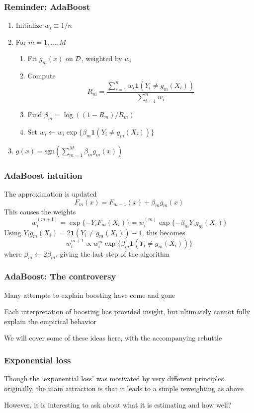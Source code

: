 \documentclass[12pt]{beamer}
\begin{document}
\begin{frame}[fragile]
\frametitle{Reminder: AdaBoost}
\begin{enumerate}
\item Initialize $w_i \equiv 1/n$
\item For $m = 1,\ldots,M$
\begin{enumerate}
\item Fit $g_m(x)$ on $\mathcal{D}$, weighted by $w_i$

\item Compute
\[
R_m = \frac{\sum_{i=1}^n w_i \mathbf{1}(Y_i \neq g_m(X_i))}{\sum_{i=1}^n w_i}
\]

\item \textcolor<1>{redmain}{Find $\beta_m = \log((1-R_m)/R_m)$}
\item \textcolor<2>{redmain}{Set $w_i \leftarrow w_i\exp\{\beta_m \mathbf{1}(Y_i \neq g_m(X_i))\}$}
\end{enumerate}
\item {} $g(x) = \textrm{sgn}\left(\sum_{m=1}^M \beta_m g_m(x)\right)$
\end{enumerate}
\end{frame}


\begin{frame}[fragile]
\frametitle{AdaBoost intuition}
The approximation is updated
\[
F_m(x) = F_{m-1}(x) + \beta_mg_m(x)
\]
This causes the weights
\[
w_i^{(m+1)} = \exp\{-Y_iF_{m}(X_i)\} = w_i^{(m)} \exp\{-\beta_m Y_i g_m(X_i)\}
\]
Using $Y_ig_m(X_i)  = 2 \mathbf{1}(Y_i \neq g_m(X_i))  - 1$, this becomes
\[
w_i^{m+1} \propto w_i^m \exp\{\beta_m \mathbf{1}(Y_i \neq g_m(X_i))\}
\]
where $\beta_m \leftarrow 2\beta_m$, giving the last step of the algorithm
\end{frame}
\begin{frame}[fragile]
\frametitle{AdaBoost: The controversy}
Many attempts to explain boosting have come and gone

\vsp
Each interpretation of boosting has provided insight, but ultimately cannot fully explain the empirical behavior

\vsp
We will cover some of these ideas here, with the accompanying rebuttle
\end{frame}

\begin{frame}[fragile]
\frametitle{Exponential loss}
Though the `exponential loss' was motivated by very different principles originally, the main attraction
is that it leads to a simple reweighting as above

\vsp
However, it is interesting to ask about what it is estimating and how well?
\end{frame}
\end{document}
